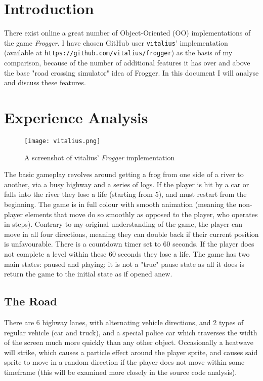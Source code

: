 \documentclass[12pt]{article}
\begin{document}
\maketitle
\tableofcontents
\pagebreak

\section{Introduction}
There exist online a great number of Object-Oriented (OO) implementations of the game \textit{Frogger}.
I have chosen GitHub user \verb|vitalius|' implementation (available at \verb|https://github.com/vitalius/frogger|) as the basis of my comparison, because of the number of additional features it has over and above the base "road crossing simulator" idea of Frogger.
In this document I will analyse and discuss these features.

\section{Experience Analysis}
\begin{figure}
  \caption{A screenshot of vitalius' \textit{Frogger} implementation}
  \texttt{[image: vitalius.png]}
\end{figure}

The basic gameplay revolves around getting a frog from one side of a river to another, via a busy highway and a series of logs.
If the player is hit by a car or falls into the river they lose a life (starting from 5), and must restart from the beginning.
The game is in full colour with smooth animation (meaning the non-player elements that move do so smoothly as opposed to the player, who operates in steps).
Contrary to my original understanding of the game, the player can move in all four directions, meaning they can double back if their current position is unfavourable.
There is a countdown timer set to 60 seconds. If the player does not complete a level within these 60 seconds they lose a life.
The game has two main states: paused and playing; it is not a "true" pause state as all it does is return the game to the initial state as if opened anew.

\subsection{The Road}
There are 6 highway lanes, with alternating vehicle directions, and 2 types of regular vehicle (car and truck), and a special police car which traverses the width of the screen much more quickly than any other object.
Occasionally a heatwave will strike, which causes a particle effect around the player sprite, and causes said sprite to move in a random direction if the player does not move within some timeframe (this will be examined more closely in the source code analysis).
\end{document}

